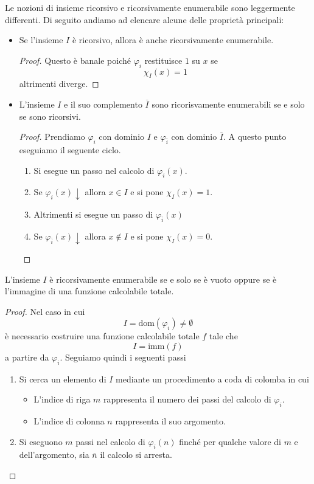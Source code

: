 Le nozioni di insieme ricorsivo e ricorsivamente enumerabile
sono leggermente differenti. Di seguito andiamo ad elencare
alcune delle proprietà principali:
\begin{itemize}
	\item Se l'insieme $I$ è ricorsivo, allora è anche
	      ricorsivamente enumerabile.
	      \begin{proof}
		      Questo è banale poiché $\varphi_i$ restituisce
		      $1$ su $x$ se
		      \[ \chi_I (x) = 1 \]
		      altrimenti diverge.
	      \end{proof}
	\item L'insieme $I$ e il suo complemento $\overline{I}$
	      sono ricorisvamente enumerabili se e solo se sono
	      ricorsivi.
	      \begin{proof}
		      Prendiamo $\varphi_i$ con dominio $I$ e
		      $\varphi_{\overline{i}}$ con dominio
		      $\overline{I}$. A questo punto eseguiamo il
		      seguente ciclo.
		      \begin{enumerate}
			      \item Si esegue un passo nel calcolo di
			            $\varphi_i(x)$.
			      \item Se $\varphi_i(x) \downarrow$ allora
			            $x \in I$ e si pone $\chi_I(x) = 1$.
			      \item Altrimenti si esegue un passo di
			            $\varphi_{\overline{i}}(x)$
			      \item Se $\varphi_{\overline{i}}(x) \downarrow$
			            allora $x \notin I$ e si pone
			            $\chi_I(x) = 0$.
		      \end{enumerate}
	      \end{proof}
\end{itemize}

\begin{theorem}
	L'insieme $I$ è ricorsivamente enumerabile se e solo se è
	vuoto oppure se è l'immagine di una funzione calcolabile
	totale.
	\begin{proof}
		Nel caso in cui
		\[ I = \text{dom}(\varphi_i) \neq \emptyset \]
		è necessario costruire una funzione calcolabile totale
		$f$ tale che
		\[ I = \text{imm}(f) \]
		a partire da $\varphi_i$. Seguiamo quindi i seguenti
		passi
		\begin{enumerate}
			\item Si cerca un elemento di $I$ mediante un
			      procedimento a coda di colomba in cui
			      \begin{itemize}
				      \item L'indice di riga $m$ rappresenta il
				            numero dei passi del calcolo di
				            $\varphi_i$.
				      \item L'indice di colonna $n$ rappresenta
				            il suo argomento.
			      \end{itemize}
			\item Si eseguono $m$ passi nel calcolo di
			      $\varphi_i(n)$ finché per qualche valore di
			      $m$ e dell'argomento, sia $\overline{n}$ il
			      calcolo si arresta.
		\end{enumerate}
	\end{proof}
\end{theorem}

